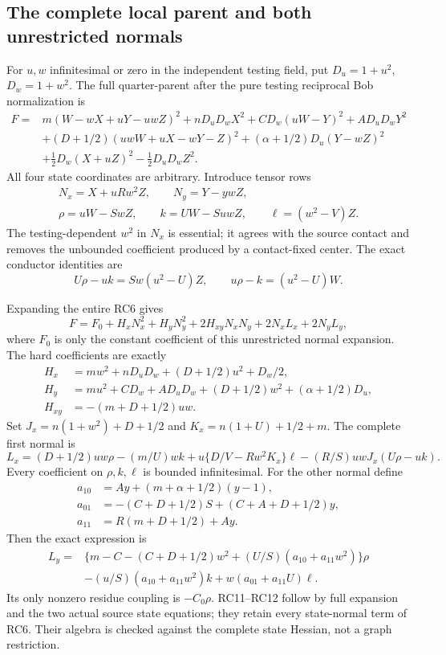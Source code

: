 \subsection{The complete local parent and both unrestricted normals}

For $u,w$ infinitesimal or zero in the independent testing field,
put $D_u=1+u^2$, $D_w=1+w^2$. The full quarter-parent after
the pure testing reciprocal Bob normalization is
\[
\begin{split}
 F={}&m(W-wX+uY-uwZ)^2+nD_uD_wX^2
       +CD_w(uW-Y)^2+AD_uD_wY^2\\
 &+(D+1/2)(uwW+uX-wY-Z)^2
       +(\alpha+1/2)D_u(Y-wZ)^2\\
 &+\tfrac12D_w(X+uZ)^2-\tfrac12D_uD_wZ^2.
\end{split}\tag{RC6}
\]
All four state coordinates are arbitrary. Introduce tensor rows
\[
 \begin{gathered}
 N_x=X+uRw^2Z,\qquad N_y=Y-ywZ,\\
 \rho=uW-SwZ,\qquad k=UW-SuwZ,\qquad \ell=(w^2-V)Z.
 \end{gathered}
 \tag{RC7}
\]
The testing-dependent $w^2$ in $N_x$ is essential; it agrees with
the source contact and removes the unbounded coefficient produced
by a contact-fixed center. The exact conductor identities are
\[
 U\rho-uk=Sw(u^2-U)Z,\qquad
 u\rho-k=(u^2-U)W.
 \tag{RC8}
\]

Expanding the entire RC6 gives
\[
 F=F_0+H_xN_x^2+H_yN_y^2+2H_{xy}N_xN_y
                         +2N_xL_x+2N_yL_y,
 \tag{RC9}
\]
where $F_0$ is only the constant coefficient of this unrestricted
normal expansion. The hard coefficients are exactly
\[
\begin{split}
 H_x&=mw^2+nD_uD_w+(D+1/2)u^2+D_w/2,\\
 H_y&=mu^2+CD_w+AD_uD_w+(D+1/2)w^2+(\alpha+1/2)D_u,\\
 H_{xy}&=-(m+D+1/2)uw.
\end{split}\tag{RC10}
\]
Set $J_x=n(1+w^2)+D+1/2$ and $K_x=n(1+U)+1/2+m$.
The complete first normal is
\[
 L_x=(D+1/2)uw\rho-(m/U)wk
 +u\{D/V-Rw^2K_x\}\ell
 -(R/S)uwJ_x(U\rho-uk).
 \tag{RC11}
\]
Every coefficient on $\rho,k,\ell$ is bounded infinitesimal.
For the other normal define
\[
 \begin{aligned}
 a_{10}&=Ay+(m+\alpha+1/2)(y-1),\\
 a_{01}&=-(C+D+1/2)S+(C+A+D+1/2)y,\\
 a_{11}&=R(m+D+1/2)+Ay.
 \end{aligned}
\]
Then the exact expression is
\[
\begin{split}
 L_y={}&\{m-C-(C+D+1/2)w^2+(U/S)(a_{10}+a_{11}w^2)\}\rho\\
 &-(u/S)(a_{10}+a_{11}w^2)k+w(a_{01}+a_{11}U)\ell.
\end{split}\tag{RC12}
\]
Its only nonzero residue coupling is $-C_0\rho$. RC11--RC12
follow by full expansion and the two actual source state equations;
they retain every state-normal term of RC6. Their algebra is
checked against the complete state Hessian, not a graph restriction.

